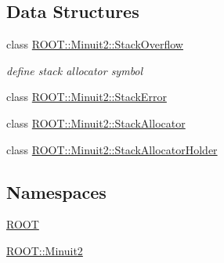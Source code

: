 \subsection*{Data Structures}
\begin{DoxyCompactItemize}
\item 
class \mbox{\hyperlink{classROOT_1_1Minuit2_1_1StackOverflow}{R\+O\+O\+T\+::\+Minuit2\+::\+Stack\+Overflow}}
\begin{DoxyCompactList}\small\item\em define stack allocator symbol \end{DoxyCompactList}\item 
class \mbox{\hyperlink{classROOT_1_1Minuit2_1_1StackError}{R\+O\+O\+T\+::\+Minuit2\+::\+Stack\+Error}}
\item 
class \mbox{\hyperlink{classROOT_1_1Minuit2_1_1StackAllocator}{R\+O\+O\+T\+::\+Minuit2\+::\+Stack\+Allocator}}
\item 
class \mbox{\hyperlink{classROOT_1_1Minuit2_1_1StackAllocatorHolder}{R\+O\+O\+T\+::\+Minuit2\+::\+Stack\+Allocator\+Holder}}
\end{DoxyCompactItemize}
\subsection*{Namespaces}
\begin{DoxyCompactItemize}
\item 
 \mbox{\hyperlink{namespaceROOT}{R\+O\+OT}}
\item 
 \mbox{\hyperlink{namespaceROOT_1_1Minuit2}{R\+O\+O\+T\+::\+Minuit2}}
\end{DoxyCompactItemize}
